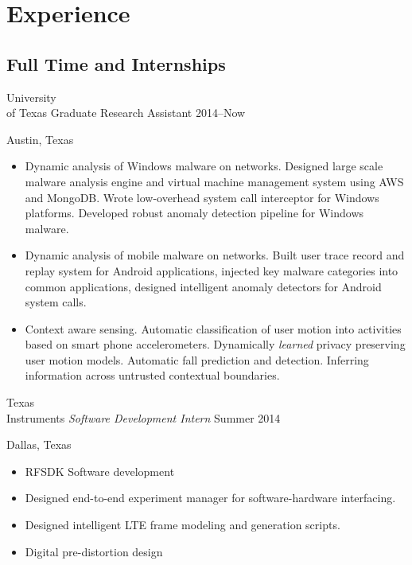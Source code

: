 \documentclass[]{friggeri-cv} %
\begin{document}

\section{Experience}

\subsection{Full Time and Internships}

\begin{entrylist}


\entry
{University \\ of Texas}
{Graduate Research Assistant}
{2014--Now}
{Austin, Texas \\
\begin{itemize}
\item Dynamic analysis of Windows malware on networks. Designed large scale malware analysis engine and virtual machine management system using AWS and MongoDB. Wrote low-overhead system call interceptor for Windows platforms. Developed robust anomaly detection pipeline for Windows malware.
\item Dynamic analysis of mobile malware on networks. Built user trace record and replay system for Android applications, injected key malware categories into common applications, designed intelligent anomaly detectors for Android system calls.
\item Context aware sensing. Automatic classification of user motion into activities based on smart phone accelerometers. Dynamically \textit{learned} privacy preserving user motion models. Automatic fall prediction and detection. Inferring information across untrusted contextual boundaries. 
\end{itemize} }


\entry
{Texas \\ Instruments}
{\emph{Software Development Intern}}
{Summer 2014}
{Dallas, Texas \\  
\begin{itemize}
\item RFSDK Software development
\item Designed end-to-end experiment manager for software-hardware interfacing.
\item Designed intelligent LTE frame modeling and generation scripts.
\item Digital pre-distortion design 
\end{itemize}}


\end{entrylist}
\end{document}
